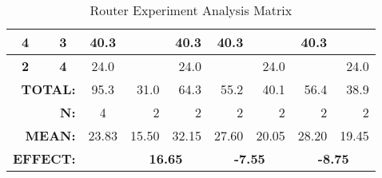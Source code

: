 \begin{sidewaystable}[]
{\begin{tabular}{|c|l|c|l|c|l|r|r|r|r|r|r|}
\multicolumn{2}{|c|}{\textbf{4}}                                                     & \multicolumn{2}{c|}{\textbf{3}}                                                   & \multicolumn{2}{c|}{40.3}                                                    & \cellcolor[HTML]{000000}        & 40.3                                            & 40.3                            & \cellcolor[HTML]{000000}        & 40.3                            & \cellcolor[HTML]{000000}        \\ \hline
\multicolumn{2}{|c|}{\textbf{2}}                                                     & \multicolumn{2}{c|}{\textbf{4}}                                                   & \multicolumn{2}{c|}{24.0}                                                    & \cellcolor[HTML]{000000}        & 24.0                                            & \cellcolor[HTML]{000000}        & 24.0                            & \cellcolor[HTML]{000000}        & 24.0                            \\ \hline
\multicolumn{4}{|r|}{\textbf{TOTAL:}}                                                                                                                                    & \multicolumn{2}{c|}{95.3}                                                    & 31.0                            & 64.3                                            & 55.2                            & 40.1                            & 56.4                            & 38.9                            \\ \hline
\multicolumn{4}{|r|}{\textbf{N:}}                                                                                                                                        & \multicolumn{2}{c|}{4}                                                       & 2                               & 2                                               & 2                               & 2                               & 2                               & 2                               \\ \hline
\multicolumn{4}{|r|}{\textbf{MEAN:}}                                                                                                                                     & \multicolumn{2}{c|}{23.83}                                                   & 15.50                           & 32.15                                           & 27.60                           & 20.05                           & 28.20                           & 19.45                           \\ \hline
\multicolumn{4}{|r|}{\textbf{EFFECT:}}                                                                                                                                   & \multicolumn{2}{l|}{\cellcolor[HTML]{000000}}                                & \multicolumn{2}{c|}{\textbf{16.65}}                                               & \multicolumn{2}{c|}{\textbf{-7.55}}                               & \multicolumn{2}{c|}{\textbf{-8.75}}                               \\ \hline
\end{tabular} } \caption{Router Experiment Analysis Matrix}\label{Filled_2fac2lev}
\end{sidewaystable}